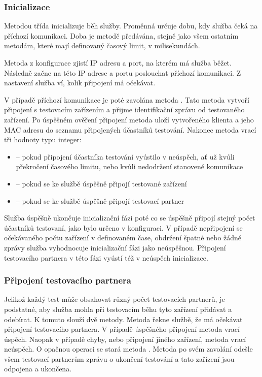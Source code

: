 \subsubsection{Inicializace}

Metodou  třída  inicializuje běh služby. Proměnná  určuje dobu, kdy služba čeká na příchozí komunikaci. Doba je metodě předávána, stejně jako všem ostatním metodám, které mají definovaný časový limit, v milisekundách. 

Metoda z konfigurace zjistí IP adresu a port, na kterém má služba běžet. Následně začne na této IP adrese a portu poslouchat příchozí komunikaci. Z nastavení služba ví, kolik připojení má očekávat. 

V případě příchozí komunikace je poté zavolána metoda . Tato metoda vytvoří připojení s testovacím zařízením a přijme identifikační zprávu od testovaného zařízení. Po úspěšném ověření připojení metoda uloží vytvořeného klienta a jeho MAC adresu do seznamu připojených účastníků testování. Nakonec metoda vrací tři hodnoty typu integer:
\begin{itemize}
    \item {} -- pokud připojení účastníka testování vyústilo v neúspěch, ať už kvůli překročení časového limitu, nebo kvůli nedodržení stanovené komunikace
    \item {} -- pokud se ke službě úspěšně připojí testované zařízení
    \item {} -- pokud se ke službě úspěšně připojí testovací partner
\end{itemize}

Služba úspěšně ukončuje inicializační fázi poté co se úspěšně připojí stejný počet účastníků testovaní, jako bylo určeno v konfiguraci. V případě nepřipojení se očekávaného počtu zařízení v definovaném čase, obdržení špatné nebo žádné zprávy služba vyhodnocuje inicializační fázi jako neúspěšnou. Připojení testovacího partnera v této fázi vyústí též v neúspěch inicializace.

\subsubsection{Připojení testovacího partnera}

Jelikož každý test může obsahovat různý počet testovacích partnerů, je podstatné, aby služba mohla při testovacím běhu tyto zařízení přidávat a odebírat. K tomuto slouží dvě metody. Metoda  řekne službě, že má očekávat připojení testovacího partnera. V případě úspěšného připojení metoda vrací úspěch. Naopak v případě chyby, nebo připojení jiného zařízení, metoda vrací neúspěch. O opačnou operaci se stará metoda . Metoda po svém zavolání odešle všem testovací partnerům zprávu o ukončení testování a tato zařízení jsou odpojena a ukončena.


